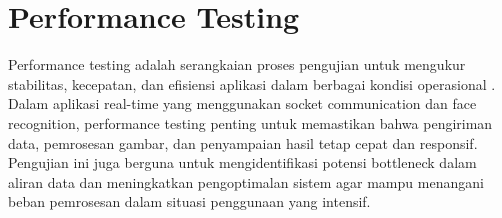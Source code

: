 \section{Performance Testing}
Performance testing adalah serangkaian proses pengujian untuk mengukur stabilitas, kecepatan, dan efisiensi aplikasi dalam berbagai kondisi operasional \parencite{jinImpactExtensionsBrowser2024}. Dalam aplikasi real-time yang menggunakan socket communication dan face recognition, performance testing penting untuk memastikan bahwa pengiriman data, pemrosesan gambar, dan penyampaian hasil tetap cepat dan responsif. Pengujian ini juga berguna untuk mengidentifikasi potensi bottleneck dalam aliran data dan meningkatkan pengoptimalan sistem agar mampu menangani beban pemrosesan dalam situasi penggunaan yang intensif.
